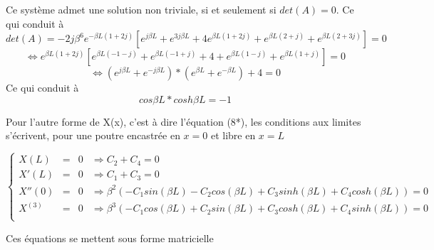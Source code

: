 \documentclass[a4paper,10pt]{article}
\begin{document}
Ce système admet une solution non triviale, si et seulement si \begin{math} det(A)=0 \end{math}. Ce qui conduit à 
\begin{equation} det(A) = -2j\beta^6 e^{-\beta L(1+2j)} [e^{j\beta L} + e^{3j\beta L} + 4e^{\beta L(1+2j)} + e^{\beta L (2+j)} + e^{\beta L(2+3j)} ] = 0     \end{equation}
\begin{equation} \iff e^{\beta L(1+2j)} [ e^{\beta L (-1-j)} + e^{\beta L (-1+j)} + 4 + e^{\beta L(1-j)} + e^{\beta L(1+j)} ] = 0  \end{equation}
\begin{equation}\iff (e^{j\beta L} + e^{-j\beta L})*(e^{\beta L}+e^{-\beta L})+4 = 0  \end{equation}
Ce qui conduit à 
\begin{equation} cos\beta L * cosh \beta L = -1  \end{equation}


Pour l'autre forme de X(x), c'est à dire l'équation (8*), les conditions aux limites s'écrivent, pour une poutre encastrée en \begin{math} x=0 \end{math} et libre en \begin{math} x=L \end{math}


\begin{equation} 
	\left\{
		\begin{aligned}
			X(L) 	&=& 	0  &\Rightarrow  C_2   +  C_4 =  0 \\
			X'(L) 	&=&	0  &\Rightarrow  C_1 + C_3  =  0\\
			X''(0)	&=&	0  &\Rightarrow  \beta^2 ( -C_1 sin(\beta L)  - C_2 cos(\beta L)  +  C_3 sinh(\beta L)  + C_4 cosh(\beta L) ) =  0  \\
			X^{(3)} &=& 0  &\Rightarrow  \beta^3 ( -C_1 cos(\beta L)  + C_2 sin(\beta L)  +  C_3 cosh(\beta L)  + C_4 sinh(\beta L) ) =  0  \\
		\end{aligned}	
	\right.
 \end{equation}

Ces équations se mettent sous forme matricielle
\end{document}
